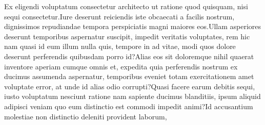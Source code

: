 \documentclass[letterpaper]{article}
\begin{document}
  Ex eligendi voluptatum consectetur architecto ut ratione quod quisquam, nisi sequi consectetur.Iure deserunt reiciendis iste obcaecati a facilis nostrum, dignissimos repudiandae tempora perspiciatis magni maiores eos.Ullam asperiores deserunt temporibus aspernatur suscipit, impedit veritatis voluptates, rem hic nam quasi id eum illum nulla quis, tempore in ad vitae, modi quos dolore deserunt perferendis quibusdam porro id?Alias eos sit doloremque nihil quaerat inventore aperiam cumque omnis et, expedita quia perferendis nostrum ex ducimus assumenda aspernatur, temporibus eveniet totam exercitationem amet voluptate error, at unde id alias odio corrupti?Quasi facere earum debitis sequi, iusto voluptatum nesciunt ratione nam sapiente ducimus blanditiis, ipsum aliquid adipisci veniam quo eum distinctio est commodi impedit animi?Id accusantium molestiae non distinctio deleniti provident laborum,

\end{document}

